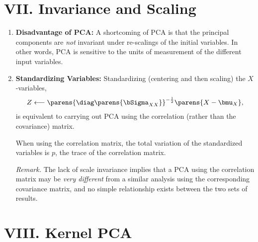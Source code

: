 \documentclass[12pt]{article}
\begin{document}
\section*{VII. Invariance and Scaling}

\begin{enumerate}[label=\textbf{\arabic*.}]
	
	\item \textbf{Disadvantage of PCA:} A shortcoming of PCA is that the principal components are \emph{not} invariant under re-scalings of the initial variables. In other words, PCA is sensitive to the units of measurement of the different input variables. 
	
	\item \textbf{Standardizing Variables:} Standardizing (centering and then scaling) the $X$-variables, 
	\begin{align*}
		Z \longleftarrow \parens{\diag \parens{\bSigma_{XX}}}^{-\frac{1}{2}} \parens{X - \bmu_X}, 
	\end{align*}
	is equivalent to carrying out PCA using the correlation (rather than the covariance) matrix. 
	
	When using the correlation matrix, the total variation of the standardized variables is $p$, the trace of the correlation matrix. 
	
	\textit{Remark.} The lack of scale invariance implies that a PCA using the correlation matrix may be \emph{very different} from a similar analysis using the corresponding covariance matrix, and no simple relationship exists between the two sets of results. 

\end{enumerate}


\section*{VIII. Kernel PCA}
\end{document}
